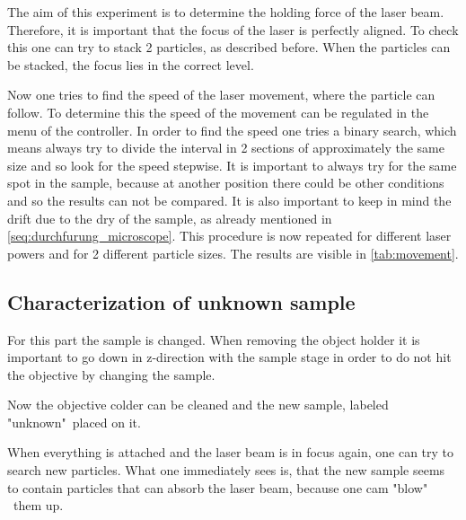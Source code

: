 \documentclass[12pt,english,ngerman]{scrartcl}
\begin{document}
The aim of this experiment is to determine the holding force of the laser beam.
Therefore, it is important that the focus of the laser is perfectly aligned. To
check this one can try to stack 2 particles, as described before. When the
particles can be stacked, the focus lies in the correct level.

Now one tries to find the speed of the laser movement, where the particle can
follow. To determine this the speed of the movement can be regulated in the
menu of the controller. In order to find the speed one tries a binary search,
which means always try to divide the interval in 2 sections of approximately
the same size and so look for the speed stepwise. It is important to always try
for the same spot in the sample, because at another position there could be
other conditions and so the results can not be compared. It is also important
to keep in mind the drift due to the dry of the sample, as already mentioned in
\autoref{seq:durchfurung_microscope}. This procedure is now repeated for
different laser powers and for 2 different particle sizes. The results are
visible in \autoref{tab:movement}.


\subsection{Characterization of unknown sample}


For this part the sample is changed. When removing the object holder it is
important to go down in z-direction with the sample stage in order to do not
hit the objective by changing the sample.

Now the objective colder can be cleaned and the new sample, labeled "unknown"\
placed on it.

When everything is attached and the laser beam is in focus again, one can try
to search new particles. What one immediately sees is, that the new sample
seems to contain particles that can absorb the laser beam, because one cam
"blow" \ them up.
\end{document}

